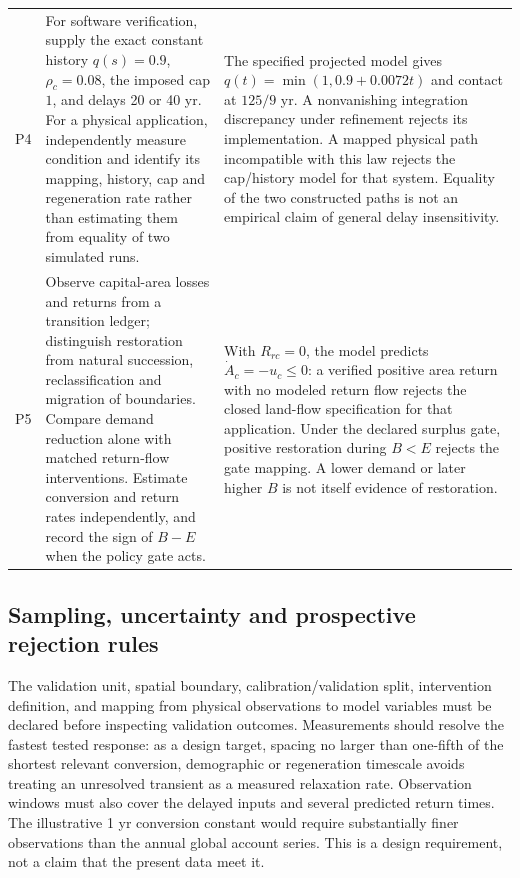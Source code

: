 \begin{longtable}{>{\raggedright\arraybackslash}p{}>{\raggedright\arraybackslash}p{}>{\raggedright\arraybackslash}p{}}
\addlinespace
P4 & For software verification, supply the exact constant history $q(s)=0.9$, $\rho_c=0.08$, the imposed cap $1$, and delays 20 or 40 yr. For a physical application, independently measure condition and identify its mapping, history, cap and regeneration rate rather than estimating them from equality of two simulated runs. & The specified projected model gives $q(t)=\min(1,0.9+0.0072t)$ and contact at $125/9$ yr. A nonvanishing integration discrepancy under refinement rejects its implementation. A mapped physical path incompatible with this law rejects the cap/history model for that system. Equality of the two constructed paths is not an empirical claim of general delay insensitivity. \\
\addlinespace
P5 & Observe capital-area losses and returns from a transition ledger; distinguish restoration from natural succession, reclassification and migration of boundaries. Compare demand reduction alone with matched return-flow interventions. Estimate conversion and return rates independently, and record the sign of $B-E$ when the policy gate acts. & With $R_{rc}=0$, the model predicts $\dot A_c=-u_c\le0$: a verified positive area return with no modeled return flow rejects the closed land-flow specification for that application. Under the declared surplus gate, positive restoration during $B<E$ rejects the gate mapping. A lower demand or later higher $B$ is not itself evidence of restoration. \\
\bottomrule
\end{longtable}

\subsection{Sampling, uncertainty and prospective rejection rules}
The validation unit, spatial boundary, calibration/validation split, intervention definition, and mapping from physical observations to model variables must be declared before inspecting validation outcomes. Measurements should resolve the fastest tested response: as a design target, spacing no larger than one-fifth of the shortest relevant conversion, demographic or regeneration timescale avoids treating an unresolved transient as a measured relaxation rate. Observation windows must also cover the delayed inputs and several predicted return times. The illustrative 1 yr conversion constant would require substantially finer observations than the annual global account series. This is a design requirement, not a claim that the present data meet it.

